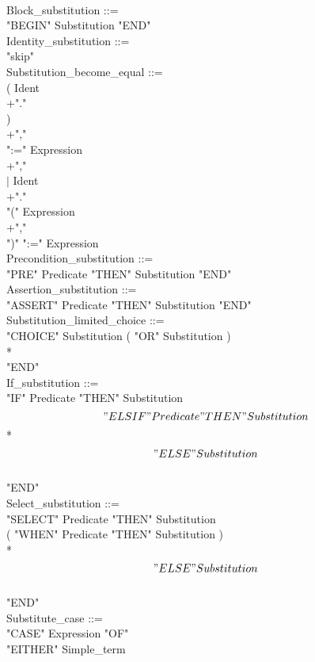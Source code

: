 \documentclass[12pt,a4paper,draft]{report}
\begin{document}
{\begin{sloppypar}
 \\ 
Block\_substitution ::= \\ 
  "BEGIN"  Substitution  "END" \\ 
Identity\_substitution ::= \\ 
  "skip"\\ 
Substitution\_become\_equal ::= \\ 
  ( Ident\\ 
+"."\\ 
 )\\ 
+","\\ 
  ":="  Expression\\ 
+","\\ 
\hspace*{0.20in} $|$ Ident\\ 
+"."\\ 
  "(" Expression\\ 
+","\\ 
 ")"  ":="  Expression \\ 
Precondition\_substitution ::= \\ 
   "PRE"  Predicate  "THEN"  Substitution  "END" \\ 
Assertion\_substitution ::= \\ 
  "ASSERT"  Predicate  "THEN"  Substitution  "END" \\ 
Substitution\_limited\_choice ::= \\ 
  "CHOICE" Substitution ( "OR" Substitution )\\ 
*\\ 
 "END" \\ 
If\_substitution ::= \\ 
  "IF"  Predicate  "THEN"  Substitution\\ 
  \[ "ELSIF"  Predicate  "THEN"  Substitution \]* \\ 
  \[ "ELSE"  Substitution \] \\ 
  "END" \\ 
Select\_substitution ::= \\ 
  "SELECT"  Predicate  "THEN"  Substitution \\ 
 ( "WHEN"  Predicate  "THEN"  Substitution )\\ 
*\\ 
   \[ "ELSE"  Substitution \] \\ 
  "END" \\ 
Substitute\_case ::= \\ 
  "CASE"  Expression  "OF"\\ 
   "EITHER"  Simple\_term\\ 

\end{sloppypar}}
\end{document}
